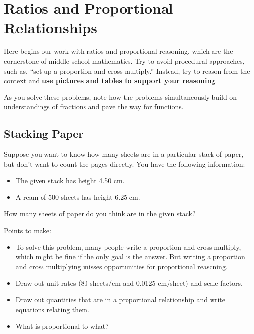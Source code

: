 \newpage
\section{Ratios and Proportional Relationships}\label{A:ratioLaunch}
Here begins our work with ratios and proportional reasoning, which are the cornerstone of middle school mathematics.  Try to avoid procedural approaches, such as, ``set up a proportion and cross multiply.''  Instead, try to reason from the context and \textbf{use pictures and tables to support your reasoning}.  

As you solve these problems, note how the problems simultaneously build on understandings of fractions and pave the way for functions.  


\subsection*{Stacking Paper}
\begin{prob}
Suppose you want to know how many sheets are in a particular stack of paper, but don't want to count the pages directly. You have the following information:
\begin{itemize}
\item The given stack has height 4.50 cm.
\item A ream of 500 sheets has height 6.25 cm.
\end{itemize}
How many sheets of paper do you think are in the given stack?
\end{prob}


\begin{teachingnote}
Points to make: 
\begin{itemize}
\item To solve this problem, many people write a proportion and cross multiply, which might be fine if the only goal is the answer.  
But writing a proportion and cross multiplying misses opportunities for proportional reasoning.  
\item Draw out unit rates (80 sheets/cm and 0.0125 cm/sheet) and scale factors.  
\item Draw out quantities that are in a proportional relationship and write equations relating them.  
\item What is proportional to what?  
\end{itemize}
\end{teachingnote}

